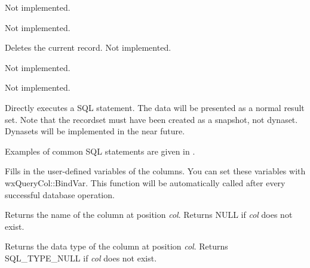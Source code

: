 Not implemented.



Not implemented.



Deletes the current record. Not implemented.



Not implemented.



Not implemented.

\label{wxrecordsetexecutesql}


Directly executes a SQL statement. The data will be presented as a normal
result set. Note that the recordset must have been created as a snapshot, not
dynaset. Dynasets will be implemented in the near future.

Examples of common SQL statements are given in .



Fills in the user-defined variables of the columns. You can set these
variables with wxQueryCol::BindVar. This function will be automatically
called after every successful database operation.



Returns the name of the column at position {\it col}. Returns NULL if {\it col} does not
exist.



Returns the data type of the column at position {\it col}. Returns SQL\_TYPE\_NULL
if {\it col} does not exist.


